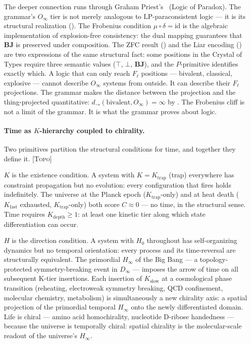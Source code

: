 \documentclass[12pt,a4paper]{article}
\newcommand{\Oinf}{O_\infty}
\newcommand{\TOPO}{\textsc{[Topo]}}
\newcommand{\glp}{\text{LP}}
\newcommand{\both}{\mathbf{BJ}}
\begin{document}
The deeper connection runs through Graham Priest's \glp\ (Logic of
Paradox). The grammar's $\Oinf$ tier is not merely analogous to
$\glp$-paraconsistent logic --- it is its structural realization
(). The Frobenius condition $\mu \circ \delta
= \text{id}$ is the algebraic implementation of explosion-free
consistency: the dual mapping guarantees that $\both$ is preserved
under composition. The ZFC result () and the Liar
encoding () are two expressions of the same
structural fact: some positions in the Crystal of Types require three
semantic values ($\top$, $\bot$, $\both$), and the $P$-primitive
identifies exactly which. A logic that can only reach $F_\ell$
positions --- bivalent, classical, explosive --- cannot describe
$\Oinf$ systems from outside. It can describe their $F_\ell$
projections. The grammar makes the distance between the projection
and the thing-projected quantitative: $d_\to(\text{bivalent}, \Oinf)
= \infty$ by . The Frobenius cliff is not a
limit of the grammar. It is what the grammar proves about logic.

\paragraph{Time as $K$-hierarchy coupled to chirality.}
Two primitives partition the structural conditions for time, and
together they define it. \TOPO\

$K$ is the existence condition. A system with $K = K_\text{trap}$
(trap) everywhere has constraint propagation but no evolution: every
configuration that fires holds indefinitely. The universe at the
Planck epoch ($K_\text{trap}$-only) and at heat death ($K_\text{fast}$
exhausted, $K_\text{trap}$-only) both score $C \approx 0$ --- no
time, in the structural sense. Time requires $K_\text{depth} \geq 1$:
at least one kinetic tier along which state differentiation can occur.

$H$ is the direction condition. A system with $H_0$ throughout has
self-organizing dynamics but no temporal orientation: every process
and its time-reversal are structurally equivalent. The primordial
$H_\infty$ of the Big Bang --- a topology-protected symmetry-breaking
event in $D_\infty$ --- imposes the arrow of time on all subsequent
K-tier insertions. Each insertion of $K_\text{slow}$ at a
cosmological phase transition (reheating, electroweak symmetry
breaking, QCD confinement, molecular chemistry, metabolism) is
simultaneously a new chirality axis: a spatial projection of the
primordial temporal $H_\infty$ onto the newly differentiated domain.
Life is chiral --- amino acid homochirality, nucleotide D-ribose
handedness --- because the universe is temporally chiral: spatial
chirality is the molecular-scale readout of the universe's $H_\infty$.
\end{document}
